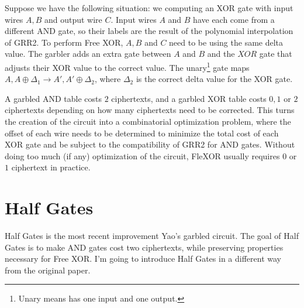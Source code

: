 Suppose we have the following situation: we computing an XOR gate with input wires $A,B$ and output wire $C$.
Input wires $A$ and $B$ have each come from a different AND gate, so their labels are the result of the polynomial interpolation of GRR2.
To perform Free XOR, $A,B$ and $C$ need to be using the same delta value. 
The garbler adds an extra gate between $A$ and $B$ and the $XOR$ gate that adjusts their XOR value to the correct value.
The unary\footnote{Unary means has one input and one output.} gate maps $A,A \oplus \Delta_1 \to A', A' \oplus \Delta_2$, where $\Delta_2$ is the correct delta value for the XOR gate.

A garbled AND table costs $2$ ciphertexts, and a garbled XOR table costs $0,1$ or $2$ ciphertexts depending on how many ciphertexts need to be corrected.
This turns the creation of the circuit into a combinatorial optimization problem, where the offset of each wire needs to be determined to minimize the total cost of each XOR gate and be subject to the compatibility of GRR2 for AND gates.
Without doing too much (if any) optimization of the circuit, FleXOR usually requires $0$ or $1$ ciphertext in practice.


\section{Half Gates}
Half Gates is the most recent improvement Yao's garbled circuit.
The goal of Half Gates is to make AND gates cost two ciphertexts, while preserving properties necessary for Free XOR. 
I'm going to introduce Half Gates in a different way from the original paper.

